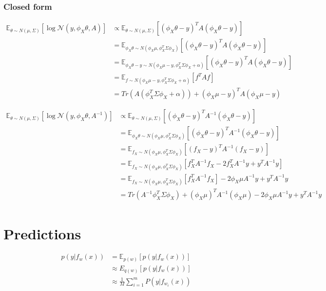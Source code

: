 \documentclass[a4paper]{scrartcl}
\begin{document}
      \subsubsection{Closed form}
        \begin{align*}
          \mathbb{E}_{\theta \sim N(\mu, \Sigma)} [\log{\mathcal{N}(y, \phi_{X}\theta, A)}]
          &\propto \mathbb{E}_{\theta \sim N(\mu, \Sigma)} [(\phi_{X}\theta - y)^T A (\phi_{X}\theta - y)]\\
          &= \mathbb{E}_{\phi_X \theta \sim N(\phi_X \mu, \phi_X^T \Sigma \phi_X)} [(\phi_{X}\theta - y)^T A (\phi_{X}\theta - y)]\\
          &= \mathbb{E}_{\phi_X \theta -y \sim N(\phi_X \mu - y, \phi_X^T \Sigma \phi_X + \alpha)} [(\phi_{X}\theta - y)^T A (\phi_{X}\theta - y)]\\
          &= \mathbb{E}_{f\sim N(\phi_X \mu - y, \phi_X^T \Sigma \phi_X + \alpha)} [f^T A f]\\
          &= Tr(A (\phi_X^T \Sigma \phi_X + \alpha)) + (\phi_X \mu - y)^T A (\phi_X \mu - y)
        \end{align*}

        \begin{align*}
          \mathbb{E}_{\theta \sim N(\mu, \Sigma)} [\log{\mathcal{N}(y, \phi_{X}\theta, A^{-1})}]
          &\propto \mathbb{E}_{\theta \sim N(\mu, \Sigma)} [(\phi_{X}\theta - y)^T A^{-1} (\phi_{X}\theta - y)]\\
          &= \mathbb{E}_{\phi_X \theta \sim N(\phi_X \mu, \phi_X^T \Sigma \phi_X)} [(\phi_{X}\theta - y)^T A^{-1} (\phi_{X}\theta - y)]\\
          &= \mathbb{E}_{f_X \sim N(\phi_X \mu, \phi_X^T \Sigma \phi_X)} [(f_X- y)^T A^{-1} (f_X- y)]\\
          &= \mathbb{E}_{f_X \sim N(\phi_X \mu, \phi_X^T \Sigma \phi_X)} [f_X^T A^{-1} f_X - 2 f_X^T A^{-1} y + y^T A^{-1} y]\\
          &= \mathbb{E}_{f_X \sim N(\phi_X \mu, \phi_X^T \Sigma \phi_X)} [f_X^T A^{-1} f_X]- 2 \phi_X \mu A^{-1} y + y^T A^{-1} y\\
          &= Tr(A^{-1} \phi_X^T \Sigma \phi_X) + (\phi_X \mu)^T A^{-1} (\phi_X \mu) - 2 \phi_X \mu A^{-1} y + y^T A^{-1} y\\
        \end{align*}
        

  \section{Predictions}
  \begin{align*}
      p(y \vert f_w(x)) 
      &= \mathbb{E}_{p(w)}[p(y \vert f_w(x))]\\
      &\approx E_{q(w)}[p(y \vert f_w(x))]\\
      &\approx \frac{1}{M}\sum_{i=1}^m P(y \vert f_{w_i}(x))
  \end{align*}
\end{document}
